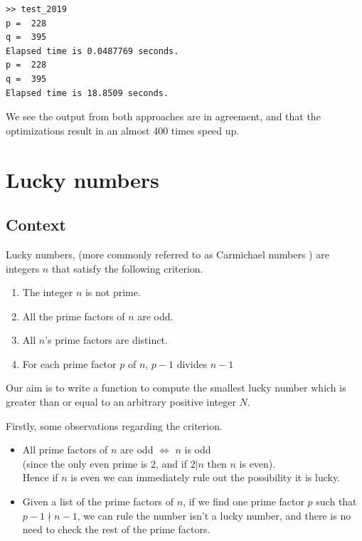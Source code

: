 \documentclass[10pt]{article}
\begin{document}
\begin{verbatim}
>> test_2019
p =  228
q =  395
Elapsed time is 0.0487769 seconds.
p =  228
q =  395
Elapsed time is 18.8509 seconds.
\end{verbatim}

We see the output from both approaches are in agreement, and that the optimizations result in an almost 400 times speed up.

\section{Lucky numbers}

\subsection{Context}
Lucky numbers, (more commonly referred to as Carmichael numbers \cite{carmichael}) are integers $n$ that satisfy the following criterion.

\begin{enumerate}
\item The integer $n$ is not prime.
\item All the prime factors of $n$ are odd.
\item All $n$'s prime factors are distinct.
\item For each prime factor $p$ of $n$, $p - 1$ divides $n-1$ 
\end{enumerate}

Our aim is to write a function to compute the smallest lucky number which is greater than or equal to an arbitrary positive integer $N$. 

Firstly, some observations regarding the criterion.

\begin{itemize}

\item All prime factors of $n$ are odd $\iff$ $n$ is odd\\
 (since the only even prime is 2, and if $2|n$ then $n$ is even).\\
 
 Hence if $n$ is even we can immediately rule out the possibility it is lucky.
\item Given a list of the prime factors of $n$, if we find one prime factor $p$ such that $p -1 \nmid n-1$, we can rule the number isn't a lucky number, and there is no need to check the rest of the prime factors.
\end{itemize}
\end{document}
